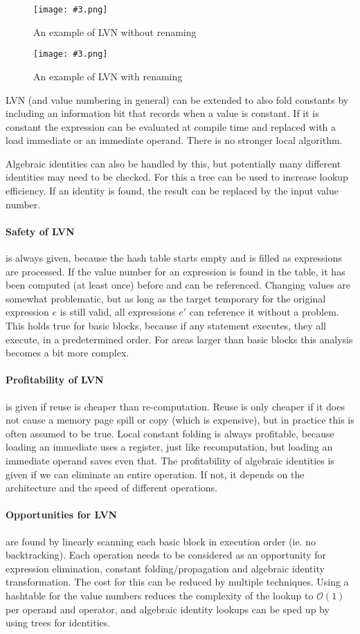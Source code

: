 \documentclass{article}
\newcommand{\fig}[4]{
	\begin{figure}[#1]
		\center
		\texttt{[image: \#3.png]}
		\caption{#4}
		\label{fig:#3}
	\end{figure}
	}
\begin{document}
\fig{h}{}{lvn}{An example of LVN without renaming}
\fig{h}{}{lvn2}{An example of LVN with renaming}

LVN (and value numbering in general) can be extended to also fold constants by including an information bit that records when a value is constant.
If it is constant the expression can be evaluated at compile time and replaced with a load immediate or an immediate operand.
There is no stronger local algorithm.

Algebraic identities can also be handled by this, but potentially many different identities may need to be checked.
For this a tree can be used to increase lookup efficiency.
If an identity is found, the result can be replaced by the input value number.

\paragraph{Safety of LVN} is always given, because the hash table starts empty and is filled as expressions are processed.
If the value number for an expression is found in the table, it has been computed (at least once) before and can be referenced.
Changing values are somewhat problematic, but as long as the target temporary for the original expression $e$ is still valid, all expressions $e'$ can reference it without a problem.
This holds true for basic blocks, because if any statement executes, they all execute, in a predetermined order.
For areas larger than basic blocks this analysis becomes a bit more complex.

\paragraph{Profitability of LVN} is given if reuse is cheaper than re-computation.
Reuse is only cheaper if it does not cause a memory page spill or copy (which is expensive), but in practice this is often assumed to be true.
Local constant folding is always profitable, because loading an immediate uses a register, just like recomputation, but loading an immediate operand saves even that.
The profitability of algebraic identities is given if we can eliminate an entire operation.
If not, it depends on the architecture and the speed of different operations.

\paragraph{Opportunities for LVN} are found by linearly scanning each basic block in execution order (ie. no backtracking).
Each operation needs to be considered as an opportunity for expression elimination, constant folding/propagation and algebraic identity transformation.
The cost for this can be reduced by multiple techniques.
Using a hashtable for the value numbers reduces the complexity of the lookup to $\mathcal{O}(1)$ per operand and operator, and algebraic identity lookups can be sped up by using trees for identities.
\end{document}
